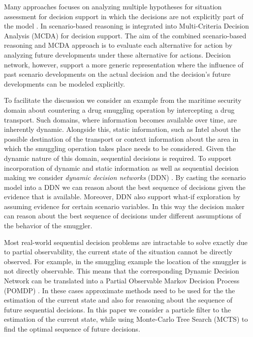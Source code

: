 \documentclass[conference]{IEEEtran}
\begin{document}
Many approaches focuses on analyzing multiple hypotheses for situation assessment for decision support in which the decisions are not explicitly part of the model \cite{roy07fus,gustavi11eisic,holsopple}. In \cite{comes09iscram} scenario-based reasoning is integrated into Multi-Criteria Decision Analysis (MCDA) for decision support. The aim of the combined scenario-based reasoning and MCDA approach is to evaluate each alternative for action by analyzing future developments under these alternative for actions. Decision network, however, support a more generic representation where the influence of past scenario developments on the actual decision and the decision's future developments can be modeled explicitly.



To facilitate the discussion we consider an example from the maritime security domain about countering a drug smuggling operation by intercepting a drug transport. Such domains, where information becomes available over time, are inherently dynamic. Alongside this, static information, such as Intel about the possible destination of the transport or context information about the area in which the smuggling operation takes place needs to be considered. Given the dynamic nature of this domain, sequential decisions is required. To support incorporation of dynamic and static information as well as sequential decision making we consider {\em dynamic decision networks} (DDN) \cite{russell02bn, jensen07book}. By casting the scenario model into a DDN we can reason about the best sequence of decisions given the evidence that is available. Moreover, DDN also support what-if exploration by assuming evidence for certain scenario variables. In this way the decision maker can reason about the best sequence of decisions under different assumptions of the behavior of the smuggler.


Most real-world sequential decision problems are intractable to solve exactly due to partial observability, \ie the current state of the situation cannot be directly observed. For example, in the smuggling example the location of the smuggler is not directly observable. This means that the corresponding Dynamic Decision Network can be translated into a Partial Observable Markov Decision Process (POMDP) \cite{pomdp}. In these cases approximate methods need to be used for the the estimation of the current state and also for reasoning about the sequence of future sequential decisions. In this paper we consider a particle filter to the estimation of the current state, while using Monte-Carlo Tree Search (MCTS) to find the optimal sequence of future decisions.
\end{document}
